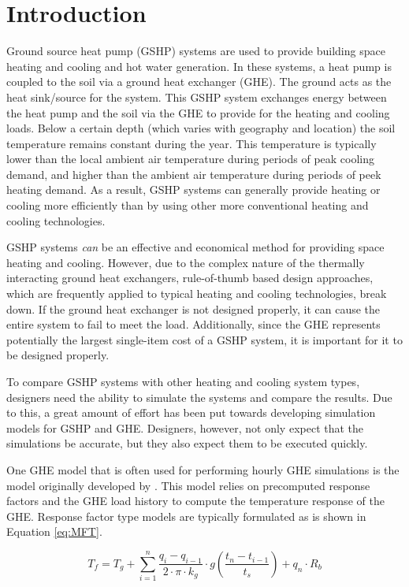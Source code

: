\documentclass[review,12pt]{elsarticle}
\begin{document}
\section*{Introduction}
Ground source heat pump (GSHP) systems are used to provide building space heating and cooling and hot water generation. In these systems, a heat pump is coupled to the soil via a ground heat exchanger (GHE).  The ground acts as the heat sink/source for the system. This GSHP system exchanges energy between the heat pump and the soil via the GHE to provide for the heating and cooling loads. Below a certain depth (which varies with geography and location) the soil temperature remains constant during the year. This temperature is typically lower than the local ambient air temperature during periods of peak cooling demand, and higher than the ambient air temperature during periods of peek heating demand. As a result, GSHP systems can generally provide heating or cooling more efficiently than by using other more conventional heating and cooling technologies. 

GSHP systems \textit{can} be an effective and economical method for providing space heating and cooling. However, due to the complex nature of the thermally interacting ground heat exchangers, rule-of-thumb based design approaches, which are frequently applied to typical heating and cooling technologies, break down. If the ground heat exchanger is not designed properly, it can cause the entire system to fail to meet the load. Additionally, since the GHE represents potentially the largest single-item cost of a GSHP system, it is important for it to be designed properly.

To compare GSHP systems with other heating and cooling system types, designers need the ability to simulate the systems and compare the results. Due to this, a great amount of effort has been put towards developing simulation models for GSHP and GHE. Designers, however, not only expect that the simulations be accurate, but they also expect them to be executed quickly.

One GHE model that is often used for performing hourly GHE simulations is the model originally developed by \cite{EskilsonClaesson1988}. This model relies on precomputed response factors and the GHE load history to compute the temperature response of the GHE. Response factor type models are typically formulated as is shown in Equation \ref{eq:MFT}.

\begin{equation}
    T_f = T_g + \sum_{i=1}^n \frac{q_{i} - q_{i-1}}{2 \cdot \pi \cdot k_g} \cdot g\left(\frac{t_n - t_{i-1}}{t_s}\right) +  q_n \cdot R_b
    \label{eq:MFT}
\end{equation}
\end{document}
